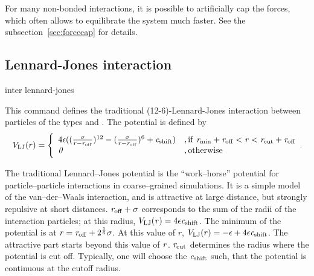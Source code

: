For many non-bonded interactions, it is possible to artificially cap
the forces, which often allows to equilibrate the system much
faster. See the subsection~\ref{sec:forcecap} for details.

\subsection{Lennard-Jones interaction}
\label{sec:LennardJones}

\begin{essyntax}
  inter  
  lennard-jones 
  \var{\epsilon} \var{\sigma} 
    
  \begin{features}
  \end{features}
\end{essyntax}

This command defines the traditional (12-6)-Lennard-Jones interaction
between particles of the types  and .  The
potential is defined by
\begin{equation}
  \label{eq:lj}
  V_\mathrm{LJ}(r) = \Biggl\{
    \begin{array}{ll}
      4\epsilon((\frac{\mathrm{\mathit{\sigma}}}{r-\mathrm{\mathit{r_\mathrm{off}}}})^{12}
      - (\frac{\mathrm{\mathit{\sigma}}}{r-\mathrm{\mathit{r_\mathrm{off}}}})^6+\mathrm{\mathit{c_\mathrm{shift}}}) 
      & \mathrm{, if~} \mathrm{\mathit{r_\mathrm{min}}}+\mathrm{\mathit{r_\mathrm{off}}} < \mathrm{\mathit{r}} < \mathrm{\mathit{r_\mathrm{cut}}}+\mathrm{\mathit{r_\mathrm{off}}}\\
      \mathit{0} 
      & \mathrm{, otherwise}\\
    \end{array}.
\end{equation}

The traditional Lennard--Jones potential is the ``work--horse''
potential for particle--particle interactions in coarse--grained
simulations.  It is a simple model of the van--der--Waals interaction,
and is attractive at large distance, but strongly repulsive at short
distances.  $\mathrm{\mathit{r_\mathrm{off}}} + \mathrm{\mathit{\sigma}}$ corresponds to the
sum of the radii of the interaction particles; at this radius,
$V_\mathrm{LJ}(\mathrm{\mathit{r}}) = 4 \mathrm{\mathit{\epsilon}} \mathrm{\mathit{c_\mathrm{shift}}}$.
The minimum of the potential is at $\mathrm{\mathit{r}} = \mathrm{\mathit{r_\mathrm{off}}} +
2^\frac{1}{6}\mathrm{\mathit{\sigma}}$.  At this value of $r$, $V_\mathrm{LJ}(r) =
-\mathrm{\mathit{\epsilon}} + 4 \mathrm{\mathit{\epsilon}} \mathrm{\mathit{c_\mathrm{shift}}}$. The
attractive part starts beyond this value of $\mathrm{\mathit{r}}$.
$\mathrm{\mathit{r_\mathrm{cut}}}$ determines the radius where the potential is
cut off. Typically, one will choose the $\mathrm{\mathit{c_\mathrm{shift}}}$ such,
that the potential is continuous at the cutoff radius.

